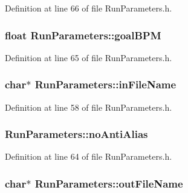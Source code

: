 Definition at line 66 of file Run\+Parameters.\+h.

\subsubsection[{\texorpdfstring{goal\+B\+PM}{goalBPM}}]{\setlength{\rightskip}{0pt plus 5cm}float Run\+Parameters\+::goal\+B\+PM}\hypertarget{class_run_parameters_a2b5559799259a982955559b53b35d67d}{}\label{class_run_parameters_a2b5559799259a982955559b53b35d67d}


Definition at line 65 of file Run\+Parameters.\+h.

\subsubsection[{\texorpdfstring{in\+File\+Name}{inFileName}}]{\setlength{\rightskip}{0pt plus 5cm}char$\ast$ Run\+Parameters\+::in\+File\+Name}\hypertarget{class_run_parameters_adf41fbdff2f0a06e80d01dc5e74fdcc0}{}\label{class_run_parameters_adf41fbdff2f0a06e80d01dc5e74fdcc0}


Definition at line 58 of file Run\+Parameters.\+h.

\subsubsection[{\texorpdfstring{no\+Anti\+Alias}{noAntiAlias}}]{ Run\+Parameters\+::no\+Anti\+Alias}\hypertarget{class_run_parameters_a24848615322f5dc4361e8296da14eb23}{}\label{class_run_parameters_a24848615322f5dc4361e8296da14eb23}


Definition at line 64 of file Run\+Parameters.\+h.

\subsubsection[{\texorpdfstring{out\+File\+Name}{outFileName}}]{\setlength{\rightskip}{0pt plus 5cm}char$\ast$ Run\+Parameters\+::out\+File\+Name}\hypertarget{class_run_parameters_a7d9b2c35b0da71abde1327c13b9994bd}{}\label{class_run_parameters_a7d9b2c35b0da71abde1327c13b9994bd}


